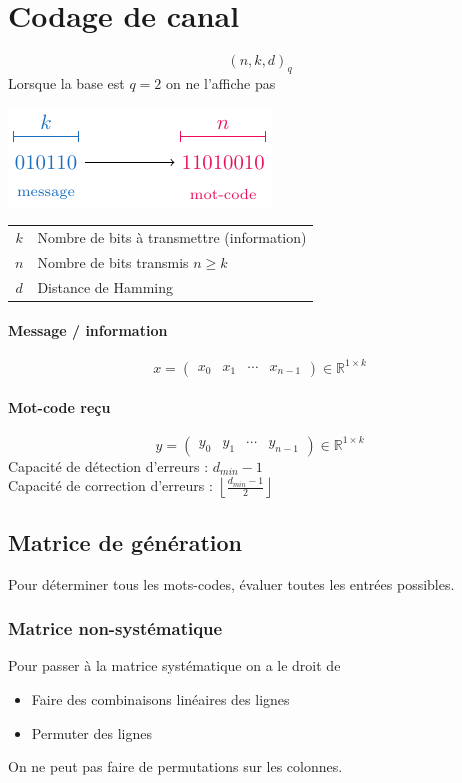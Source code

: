 \documentclass[resume.tex]{subfiles}
\begin{document}
\section{Codage de canal}
$$(n,k,d)_q$$
Lorsque la base est $q=2$ on ne l'affiche pas
\begin{center}
\includegraphics[scale=1,page=1]{drwg_1.pdf}
\end{center}
\begin{center}
\begin{tabular}{c|l}
$k$ & Nombre de bits à transmettre (information)\\
$n$ & Nombre de bits transmis $n\geq k$\\
$d$ & Distance de Hamming
\end{tabular}
\end{center}
\paragraph{Message / information}
$$x=\begin{pmatrix}
x_0 & x_1 & \cdots & x_{n-1}
\end{pmatrix}\in \mathbb{R}^{1\times k}$$
\paragraph{Mot-code reçu}
$$y=\begin{pmatrix}
y_0 & y_1 & \cdots & y_{n-1}
\end{pmatrix}\in \mathbb{R}^{1\times k}$$
Capacité de détection d'erreurs : $d_{min}-1$\\
Capacité de correction d'erreurs : $\left\lfloor\frac{d_{min}-1}{2}\right\rfloor$
\subsection{Matrice de génération}
Pour déterminer tous les mots-codes, évaluer toutes les entrées possibles.
\subsubsection{Matrice non-systématique}
Pour passer à la matrice systématique on a le droit de
\begin{itemize}
\item Faire des combinaisons linéaires des lignes
\item Permuter des lignes
\end{itemize}
On ne peut pas faire de permutations sur les colonnes.
\end{document}
